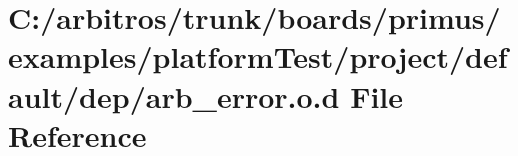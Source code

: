 \hypertarget{platform_test_2project_2default_2dep_2arb__error_8o_8d}{\section{C\-:/arbitros/trunk/boards/primus/examples/platform\-Test/project/default/dep/arb\-\_\-error.o.\-d File Reference}
\label{platform_test_2project_2default_2dep_2arb__error_8o_8d}
}
